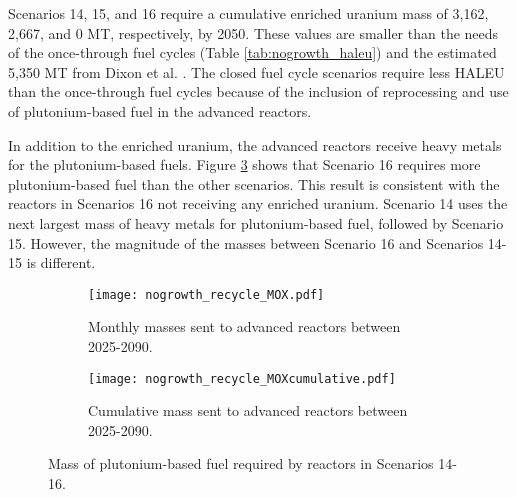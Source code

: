 Scenarios 14, 15, and 16 require a cumulative enriched uranium 
mass of 3,162, 2,667, and 0 MT, respectively, by 2050. These values 
are smaller than the needs of the once-through fuel cycles 
(Table \ref{tab:nogrowth_haleu}) and the estimated 5,350 MT from 
Dixon et al. \cite{dixon_estimated_2022}. The closed fuel cycle 
scenarios require less \gls{HALEU} than the once-through 
fuel cycles because of the inclusion of reprocessing and use 
of plutonium-based fuel in the advanced reactors. 

In addition to the enriched uranium, the advanced 
reactors receive heavy metals for the plutonium-based 
fuels. Figure 
\ref{fig:nogrowth_recycle_mox} shows that Scenario 16 requires more 
plutonium-based fuel than the other scenarios. This result is consistent 
with the reactors in Scenarios 16 not receiving any enriched 
uranium. Scenario 14 uses the next largest mass of heavy metals for 
plutonium-based fuel, followed by Scenario 15. However, the 
magnitude of the masses between Scenario 16 and Scenarios 14-15 is 
different. 

\begin{figure}[h!]
    \centering
    \begin{subfigure}[b]{0.45\textwidth}
        \centering
        \texttt{[image: nogrowth\_recycle\_MOX.pdf]}
        \caption{Monthly masses sent to 
        advanced reactors between 2025-2090.}
        \label{fig:nogrowth_recycle_AR_mox}
    \end{subfigure}
    \hfill
    \begin{subfigure}[b]{0.45\textwidth}
        \centering
        \texttt{[image: nogrowth\_recycle\_MOXcumulative.pdf]}
        \caption{Cumulative mass 
        sent to advanced reactors between 2025-2090.}
        \label{fig:nogrowth_recycle_mox_cumulative}
    \end{subfigure}
       \caption{Mass of plutonium-based fuel required by reactors
        in Scenarios 14-16.}
       \label{fig:nogrowth_recycle_mox}
\end{figure}

